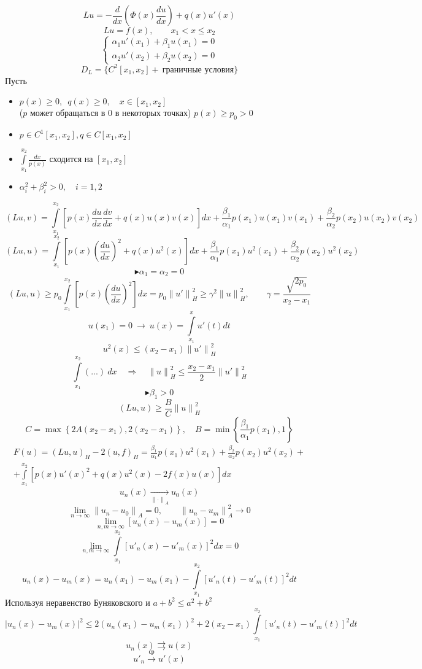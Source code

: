 \documentclass[12pt, a4paper]{article}
\newcommand{\Int}{\int\limits}
\begin{document}
\[ Lu = - \frac{d}{dx} \left( \Phi(x) \frac{du}{dx} \right) + q(x)u'(x) \]
\[ Lu = f(x), \qquad x_1 < x \leq x_2 \]
\[ \left\{ \begin{array}{l}
	\alpha_1 u'(x_1) + \beta_1 u(x_1) = 0 \\
	\alpha_2 u'(x_2) + \beta_2 u(x_2) = 0
\end{array} \right. \]
\[ D_L = \{ C^2[x_1, x_2] + \ \text{граничные условия} \} \]
Пусть
\begin{itemize}
	\item $ p(x) \geq 0, \enspace q(x) \geq 0, \quad x \in [x_1, x_2] $ \\ ($p$ может обращаться в 0 в некоторых точках) $ p(x) \geq p_0 > 0 $
	\item $ p \in C^1[x_1, x_2], q \in C[x_1, x_2] $
	\item $ \Int_{x_1}^{x_2} \frac{dx}{p(x)} $ сходится на $ [x_1, x_2] $
	\item $ \alpha_i^2 + \beta_i^2 > 0, \quad i = 1, 2 $
\end{itemize}
\[ (Lu, v) = \Int_{x_1}^{x_2} \left[ p(x) \frac{du}{dx} \frac{dv}{dx} + q(x) u(x) v(x) \right] dx + \frac{\beta_1}{\alpha_1} p(x_1) u(x_1) v(x_1) + \frac{\beta_2}{\alpha_2} p(x_2) u(x_2) v(x_2) \]
\[ (Lu, u) = \Int_{x_1}^{x_2} \left[ p(x) {\left(\frac{du}{dx}\right)}^2 + q(x) u^2(x) \right] dx + \frac{\beta_1}{\alpha_1} p(x_1) u^2(x_1) + \frac{\beta_2}{\alpha_2} p(x_2) u^2(x_2)  \]
\[  \blacktriangleright \alpha_1 = \alpha_2 = 0 \]
\[ (Lu, u) \geq p_0 \Int_{x_1}^{x_2} \left[ p(x) {\left(\frac{du}{dx}\right)}^2 \right] dx = p_0 {\| u' \|}^2_H \geq \gamma^2 {\| u \|}^2_H, \qquad \gamma = \frac{\sqrt{2p_0}}{x_2 - x_1} \]
\[ u(x_1)=0 \ \rightarrow \ u(x) = \Int_{x_1}^{x} u'(t) dt \]
\[ u^2(x) \leq (x_2 - x_1) {\| u' \|}^2_H \]
\[ \Int_{x_1}^{x_2} (...) \ dx \quad \Rightarrow \quad {\| u \|}^2_H \leq \frac{x_2 - x_1}{2} {\| u' \|}^2_H \]
\[ \blacktriangleright \beta_1 > 0 \]
\[ (Lu, u) \geq \frac{B}{C} {\| u \|}^2_H \]
\[ C = \max\left\{2A(x_2 -x_1), 2(x_2 - x_1)\right\}, \quad B = \min\left\{\frac{\beta_1}{\alpha_1} p(x_1), 1\right\} \]
\begin{multline*}
	F(u) = {(Lu, u)}_H - 2{(u,f)}_H = \frac{\beta_1}{\alpha_1} p(x_1) u^2(x_1) + \frac{\beta_2}{\alpha_2} p(x_2) u^2(x_2) + \\ + \Int_{x_1}^{x_2} \left[ p(x) {u'(x)}^2 + q(x) u^2(x) - 2f(x)u(x) \right] dx
\end{multline*}
\[ u_n(x) \underset{{\| \cdot \|}_A}{\rightarrow} u_0(x) \]
\[ \underset{n \rightarrow \infty}{\lim} {\| u_n - u_0 \|}_A = 0, \qquad {\| u_n - u_m \|}_A^2 \rightarrow 0 \]
\[ \underset{n,m \rightarrow \infty}{\lim} \left[ u_n(x) - u_m(x) \right] = 0 \]
\[ \underset{n,m \rightarrow \infty}{\lim} \Int_{x_1}^{x_2} {\left[ {u'}_n(x) - {u'}_m(x) \right]}^2 dx = 0 \]
\[ u_n(x) - u_m(x) = u_n(x_1) - u_m(x_1) - \Int_{x_1}^{x_2} {\left[ {u'}_n(t) - {u'}_m(t) \right]}^2 dt \]
Используя неравенство Буняковского и $ {a+b}^2 \leq a^2 + b^2 $
\[ {| u_n(x) - u_m(x) |}^2 \leq 2 {(u_n(x_1) - u_m(x_1))}^2 + 2(x_2 - x_1) \Int_{x_1}^{x_2} {\left[ {u'}_n(t) - {u'}_m(t) \right]}^2 dt \]
\[ u_n(x) \rightrightarrows u(x) \]
\[ {u'}_n \overset{\text{ср}}{\rightarrow} u'(x) \]
\end{document}
